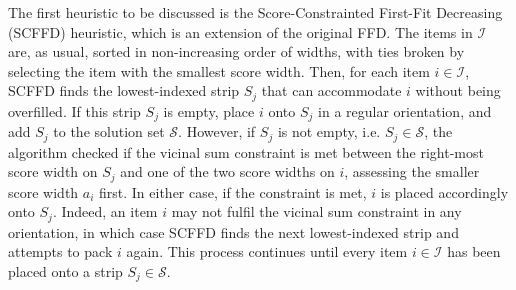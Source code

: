 \documentclass[oribibl]{llncs}
\begin{document}
The first heuristic to be discussed is the Score-Constrainted First-Fit Decreasing (SCFFD) heuristic, which is an extension of the original FFD. The items in $\mathcal{I}$ are, as usual, sorted in non-increasing order of widths, with ties broken by selecting the item with the smallest score width. Then, for each item $i \in \mathcal{I}$, SCFFD finds the lowest-indexed strip $S_j$ that can accommodate $i$ without being overfilled. If this strip $S_j$ is empty, place $i$ onto $S_j$ in a regular orientation, and add $S_j$ to the solution set $\mathcal{S}$. However, if $S_j$ is not empty, i.e. $S_j \in \mathcal{S}$, the algorithm checked if the vicinal sum constraint is met between the right-most score width on $S_j$ and one of the two score widths on $i$, assessing the smaller score width $a_i$ first. In either case, if the constraint is met, $i$ is placed accordingly onto $S_j$. Indeed, an item $i$ may not fulfil the vicinal sum constraint in any orientation, in which case SCFFD finds the next lowest-indexed strip and attempts to pack $i$ again. This process continues until every item $i \in \mathcal{I}$ has been placed onto a strip $S_j \in \mathcal{S}$.


















































\end{document}
